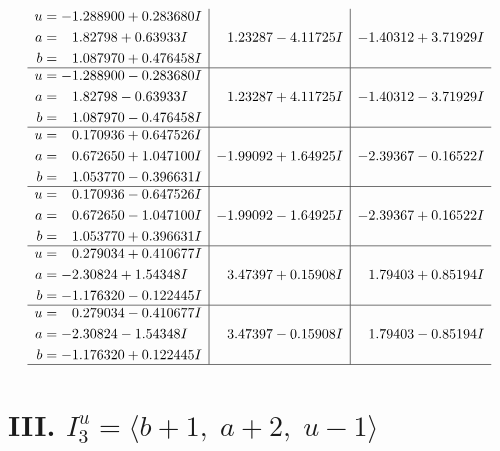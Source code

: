 \documentclass[1p]{elsarticle_modified}
\theoremstyle{definition}
\begin{document}
$$\begin{array}{c|c|c}
\begin{aligned}
u &= -1.288900 + 0.283680 I \\
a &= \phantom{-}1.82798 + 0.63933 I \\
b &= \phantom{-}1.087970 + 0.476458 I\end{aligned}
 & \phantom{-}1.23287 - 4.11725 I & -1.40312 + 3.71929 I \\ \hline\begin{aligned}
u &= -1.288900 - 0.283680 I \\
a &= \phantom{-}1.82798 - 0.63933 I \\
b &= \phantom{-}1.087970 - 0.476458 I\end{aligned}
 & \phantom{-}1.23287 + 4.11725 I & -1.40312 - 3.71929 I \\ \hline\begin{aligned}
u &= \phantom{-}0.170936 + 0.647526 I \\
a &= \phantom{-}0.672650 + 1.047100 I \\
b &= \phantom{-}1.053770 - 0.396631 I\end{aligned}
 & -1.99092 + 1.64925 I & -2.39367 - 0.16522 I \\ \hline\begin{aligned}
u &= \phantom{-}0.170936 - 0.647526 I \\
a &= \phantom{-}0.672650 - 1.047100 I \\
b &= \phantom{-}1.053770 + 0.396631 I\end{aligned}
 & -1.99092 - 1.64925 I & -2.39367 + 0.16522 I \\ \hline\begin{aligned}
u &= \phantom{-}0.279034 + 0.410677 I \\
a &= -2.30824 + 1.54348 I \\
b &= -1.176320 - 0.122445 I\end{aligned}
 & \phantom{-}3.47397 + 0.15908 I & \phantom{-}1.79403 + 0.85194 I \\ \hline\begin{aligned}
u &= \phantom{-}0.279034 - 0.410677 I \\
a &= -2.30824 - 1.54348 I \\
b &= -1.176320 + 0.122445 I\end{aligned}
 & \phantom{-}3.47397 - 0.15908 I & \phantom{-}1.79403 - 0.85194 I\\
 \hline 
 \end{array}$$\newpage\newpage\renewcommand{\arraystretch}{1}
\centering \section*{III. $I^u_{3}= \langle b+1,\;a+2,\;u-1 \rangle$}
\end{document}
